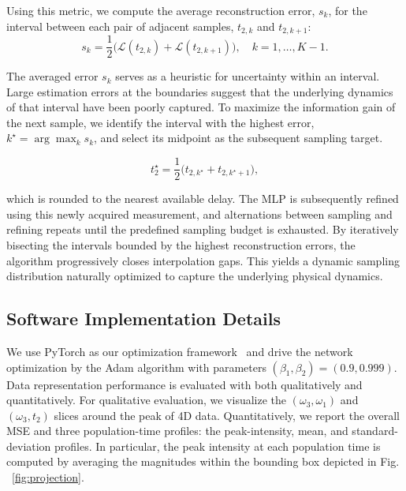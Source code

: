 \documentclass{optica-article}
\begin{document}
Using this metric, we compute the average reconstruction error, $s_k$, for the interval between each pair of adjacent samples, $t_{2,k}$ and $t_{2,k+1}$:
\begin{equation}
    s_k = \frac{1}{2}\big(\mathcal{L}(t_{2,k}) + \mathcal{L}(t_{2,k+1})\big), \quad k=1,\ldots,K-1.
\label{eq:score-mean}
\end{equation}

The averaged error $s_k$ serves as a heuristic for uncertainty within an interval. Large estimation errors at the boundaries suggest that the underlying dynamics of that interval have been poorly captured. To maximize the information gain of the next sample, we identify the interval with the highest error, $k^\star = \arg\max_k s_k$, and select its midpoint as the subsequent sampling target.


\begin{equation}
    \label{eq:midpoint}
    t_2^\star = \frac{1}{2}\big(t_{2,k^\star} + t_{2,k^\star+1}\big),
\end{equation}

which is rounded to the nearest available delay. The MLP is subsequently refined using this newly acquired measurement, and alternations between sampling and refining repeats until the predefined sampling budget is exhausted. By iteratively bisecting the intervals bounded by the highest reconstruction errors, the algorithm progressively closes interpolation gaps. This yields a dynamic sampling distribution naturally optimized to capture the underlying physical dynamics.

\subsection{Software Implementation Details}

We use PyTorch as our optimization framework~\cite{paszke2019pytorch} and drive the network optimization by the Adam algorithm \cite{kingma2014adam} with parameters $(\beta_1, \beta_2) = (0.9, 0.999)$. Data representation performance is evaluated with both qualitatively and quantitatively. For qualitative evaluation, we visualize the $(\omega_3,\omega_1)$ and $(\omega_3, t_2)$ slices around the peak of 4D data. Quantitatively, we report the overall MSE and three population-time profiles: the peak-intensity, mean, and standard-deviation profiles. In particular, the peak intensity at each population time is computed by averaging the magnitudes within the bounding box depicted in Fig. ~\ref{fig:projection}.
\end{document}
